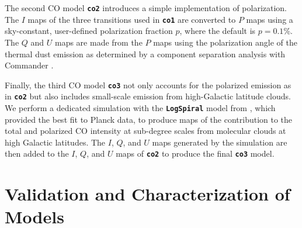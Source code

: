 \documentclass[twocolumn]{aastex631}
\begin{document}
The second CO model {\bf\texttt{co2}} introduces a simple implementation of polarization. The $I$ maps of the three transitions used in  {\bf\texttt{co1}} are converted to $P$ maps using a sky-constant, user-defined polarization fraction $p$, where the default is $p = 0.1$\%. The $Q$ and $U$ maps are made from the $P$ maps using the polarization angle of the thermal dust emission as determined by a component separation analysis with Commander \citep{planck2014-a12}.

Finally, the third CO model {\bf\texttt{co3}} not only accounts for the polarized emission as in {\bf\texttt{co2}} but also includes small-scale emission from high-Galactic latitude clouds. We perform a dedicated simulation with the {\bf\texttt{LogSpiral}} model from \citet{Puglisi:2017}, which provided the best fit to Planck data, to produce maps of the contribution to the total and polarized CO intensity at sub-degree scales from molecular clouds at high Galactic latitudes. The $I$, $Q$, and $U$ maps generated by the simulation are then added to the $I$, $Q$, and $U$ maps of {\bf\texttt{co2}} to produce the final {\bf\texttt{co3}} model.
 
\section{Validation and Characterization of Models} \label{sec:validation}
\end{document}
